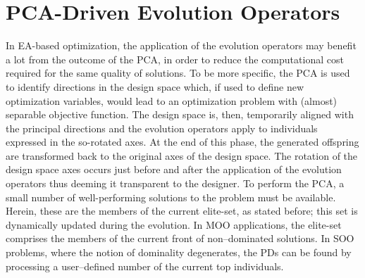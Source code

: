 \section{PCA-Driven Evolution Operators} 
In EA-based optimization, the application of the evolution operators may benefit a lot from the outcome of the PCA, in order to reduce the computational cost required for the same quality of solutions. To be more specific, the PCA is used to identify directions in the design space which, if used to define new optimization variables, would lead to an optimization problem with (almost) separable objective function. The design space is, then, temporarily aligned with the principal directions and the evolution operators apply to individuals expressed in the so-rotated axes. At the end of this phase, the generated offspring are transformed back to the original axes of the design space. The rotation of the design space axes occurs just before and after the application of the evolution operators thus deeming it transparent to the designer. To perform the PCA, a small number of well-performing solutions to the problem must be available. Herein, these are the members of the current elite-set, as stated before; this set is dynamically updated during the evolution. In MOO applications, the elite-set comprises the members of the current front of non--dominated solutions. In SOO problems, where the notion of dominality degenerates, the PDs  can be found by processing a user--defined number of the current top individuals. 

